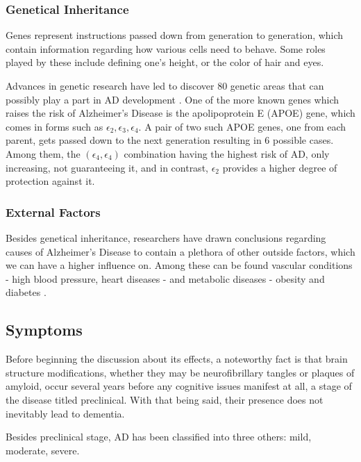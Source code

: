 \documentclass[a4paper, 12pt]{article}
\begin{document}
\subsubsection*{Genetical Inheritance} %
Genes represent instructions passed down from generation to generation, which contain information regarding how various cells
need to behave. Some roles played by these include defining one's height, or the color of hair and eyes.

Advances in genetic research have led to discover 80 genetic areas that can possibly play a part in AD development \cite{NIH2}.
One of the more known genes which raises the risk of Alzheimer's Disease is the apolipoprotein E (APOE) gene, which comes in forms such as
$\epsilon_2, \epsilon_3, \epsilon_4$. A pair of two such APOE genes, one from each parent, gets passed down to the next generation
resulting in 6 possible cases. Among them, the $\left(\epsilon_4,\epsilon_4\right)$ combination having the highest risk of AD,
only increasing, not guaranteeing it, and in contrast, $\epsilon_2$ provides a higher degree of protection against it.

\subsubsection*{External Factors} %
Besides genetical inheritance, researchers have drawn conclusions regarding causes of Alzheimer's Disease to contain a plethora
of other outside factors, which we can have a higher influence on.
Among these can be found vascular conditions - high blood pressure, heart diseases - and metabolic diseases - obesity and diabetes
\cite{NIH2}.

\subsection{Symptoms} %
Before beginning the discussion about its effects, a noteworthy fact is that brain structure modifications, whether they may be
neurofibrillary tangles or plaques of amyloid, occur several years before any cognitive issues manifest at all, a stage of the disease titled
preclinical. With that being said, their presence does not inevitably lead to dementia.

Besides preclinical stage, AD has been classified into three others: mild, moderate, severe.
\end{document}
